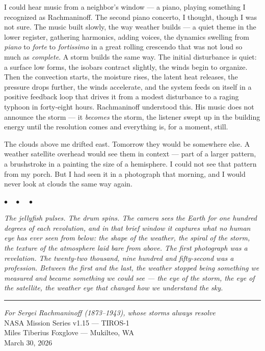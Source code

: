 \documentclass[12pt, letterpaper]{article}
\begin{document}
I could hear music from a neighbor's window --- a piano, playing something I recognized as Rachmaninoff. The second piano concerto, I thought, though I was not sure. The music built slowly, the way weather builds --- a quiet theme in the lower register, gathering harmonics, adding voices, the dynamics swelling from \emph{piano} to \emph{forte} to \emph{fortissimo} in a great rolling crescendo that was not loud so much as \emph{complete}. A storm builds the same way. The initial disturbance is quiet: a surface low forms, the isobars contract slightly, the winds begin to organize. Then the convection starts, the moisture rises, the latent heat releases, the pressure drops further, the winds accelerate, and the system feeds on itself in a positive feedback loop that drives it from a modest disturbance to a raging typhoon in forty-eight hours. Rachmaninoff understood this. His music does not announce the storm --- it \emph{becomes} the storm, the listener swept up in the building energy until the resolution comes and everything is, for a moment, still.

The clouds above me drifted east. Tomorrow they would be somewhere else. A weather satellite overhead would see them in context --- part of a larger pattern, a brushstroke in a painting the size of a hemisphere. I could not see that pattern from my porch. But I had seen it in a photograph that morning, and I would never look at clouds the same way again.

\begin{center}
$\bullet\quad\bullet\quad\bullet$
\end{center}

\noindent\textit{The jellyfish pulses. The drum spins. The camera sees the Earth for one hundred degrees of each revolution, and in that brief window it captures what no human eye has ever seen from below: the shape of the weather, the spiral of the storm, the texture of the atmosphere laid bare from above. The first photograph was a revelation. The twenty-two thousand, nine hundred and fifty-second was a profession. Between the first and the last, the weather stopped being something we measured and became something we could see --- the eye of the storm, the eye of the satellite, the weather eye that changed how we understand the sky.}

\vspace{2em}
\begin{center}
\noindent\rule{0.3\textwidth}{0.4pt}
\end{center}
\vspace{1em}

\begin{center}
\textit{For Sergei Rachmaninoff (1873--1943), whose storms always resolve}\\[0.5em]
{\small NASA Mission Series v1.15 --- TIROS-1}\\
{\small Miles Tiberius Foxglove --- Mukilteo, WA}\\
{\small March 30, 2026}
\end{center}
\end{document}
